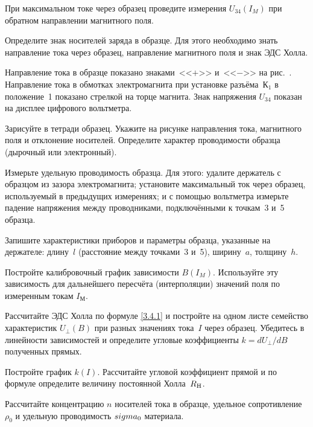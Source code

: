 \begin{lab:task}
\item При максимальном токе через образец проведите измерения $U_{34}(I_{M})$ 
при обратном направлении магнитного поля.

\item Определите знак носителей заряда в образце. Для этого необходимо знать
направление тока через образец, направление магнитного поля и знак ЭДС Холла.

Направление тока в образце показано знаками~<<$+$>> и~<<$-$>> на
рис.~. Направление тока в обмотках электромагнита при 
установке разъёма~К$_1$ в положение~1 показано стрелкой на торце магнита.
Знак напряжения $U_{34}$ показан на дисплее цифрового вольтметра.

Зарисуйте в тетради образец. Укажите на рисунке направления тока, магнитного
поля и отклонение носителей. Определите характер проводимости образца
(дырочный или электронный).

\item Измерьте удельную проводимость образца. Для этого: 
удалите держатель с образцом из зазора электромагнита;
установите максимальный ток через образец, используемый в предыдущих измерениях;
и с помощью вольтметра измерьте падение напряжения между проводниками, 
подключёнными к точкам~3 и~5 образца.

\item Запишите характеристики приборов и параметры образца, указанные на держателе:
длину~$l$ (расстояние между точками~3 и~5), ширину~$a$, толщину~$h$.



\item Постройте калибровочный график зависимости $B(I_{M})$. 
Используйте эту зависимость для дальнейшего пересчёта (интерполяции)
значений поля по измеренным токам $I_{М}$.


\item Рассчитайте ЭДС Холла по формуле \eqref{3.4.1} и постройте на одном листе
семейство характеристик $U_{\perp}(B)$ при разных значениях тока~$I$ через
образец. Убедитесь в линейности зависимостей и определите угловые 
коэффициенты $k=dU_{\perp}/dB$ полученных прямых.

\item Постройте график $k(I)$. Рассчитайте угловой коэффициент прямой 
и по формуле  определите величину постоянной Холла~$R_{\rm H}$.

\item Рассчитайте концентрацию $n$ носителей тока в образце,
удельное сопротивление $\rho_0$ и удельную проводимость $\\sigma_0$ материала.


\end{lab:task}
